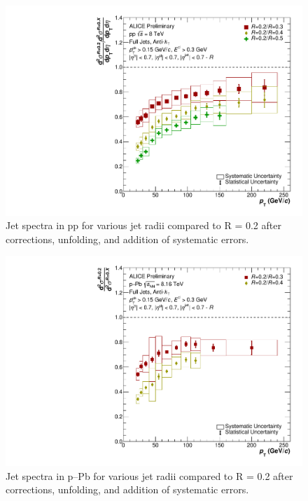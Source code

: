 \documentclass[ALICE]{ALICE_analysis_notes}
\newcommand{\pPb}{{\mbox{p--Pb}}\xspace}
\newcommand{\pp}{pp\xspace}
\begin{document}
\begin{figure}
    \centering
    \includegraphics[width=15cm]{figures/FinalResults/Bayes_reg6_Ratio.pdf}
    \caption{Jet spectra in \pp for various jet radii compared to R = 0.2 after corrections, unfolding, and addition of systematic errors.}
    \label{fig:finalSpectraRatios}
\end{figure}

\begin{figure}
    \centering
    \includegraphics[width=15cm]{figures/pPbFigures/FinalResults/Bayes_reg6_Ratio.pdf}
    \caption{Jet spectra in \pPb for various jet radii compared to R = 0.2 after corrections, unfolding, and addition of systematic errors.}
    \label{fig:finalSpectraRatiospPb}
\end{figure}
\end{document}
